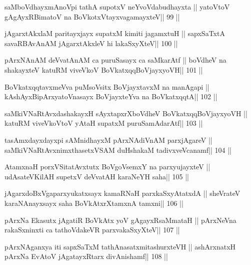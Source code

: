 \begin{shl}
saMboVdhayxmAnoV\s pi tathA supotxV neYvoVdabudhayxta ||
yatoV\s toV gAgAyxRBimatoV na BoVkotxVtayxvagamayxteV\hfill || 99 ||
\end{shl}

\begin{shl}
jAgarxtAkxlaM paritayxjayx supatxM kimiti jagamxtuH ||
sapxSaTxtA savaRBAvAnAM jAgarxtAkxleV hi lakaSxyXteV\hfill || 100 ||
\end{shl}

\begin{shl}
pArxNAnAM deVvatAnAM ca puruSasayx ca saMkarAtf ||
boVdheV na shakayxteV katuRM viveVkoV BoVkatxqqBoVjayxyoVH\hfill || 101 ||
\end{shl}

\begin{shl}
BoVkatxqqtavxmeVva puMsoV\s sitx BoVjayxtavxM na manAgapi ||
kAshAyxBipArxyatoV\s nasayx BoVjayxteYva na BoVkatxqqtA\hfill || 102 ||
\end{shl}

\begin{shl}
saMkiVNaRtAvxdashakayxH sAyxtapxrXboVdheV BoVkatxqqBoVjayxyoVH ||
katuRM viveVkoV\s toV yAtaH supatxM puruSamAdarAtf\hfill || 103 ||
\end{shl}

\begin{shl}
tasAmxdayxdayxpi sAMnidhayxM pArxNAdiVnAM parxjAgareV ||
saMkiVNaRtAvxnimxthasetxVSAM duHshakaM tadivxveVcanamf\hfill || 104 ||
\end{shl}

\begin{shl}
AtamxnaH porxVSitatAvxtutx BoVgoV\s semxY na parxyujayxteV ||
udAsateV\s KilAH supetxV deVvatAH karaNeYH saha\hfill || 105 ||
\end{shl}

\begin{shl}
jAgarxdoBxVgaparxyukatxsayx kamaRNaH parxkaSxyAtatxdA ||
sheVrateV karaNAnayxsayx saha BoVkAtxrX\s\s tamxnA \s\s tamxni\hfill || 106 ||
\end{shl}

\begin{shl}
pArxNa Ekasutx jAgatiR BoVkAtx yoV gAgayxRsaMmataH ||
pArxNeVna rakaSxninxti ca tathoVdakeVR parxvakaSxyXteV\hfill || 107 ||
\end{shl}

\begin{shl}
pArxNAganxya iti sapxSaTxM tathA\s nasatxmitashurxteVH ||
ashArxnatxH pArxNa EvAtoV jAgatayxRtarx divAnishamf\hfill || 108 ||
\end{shl}


